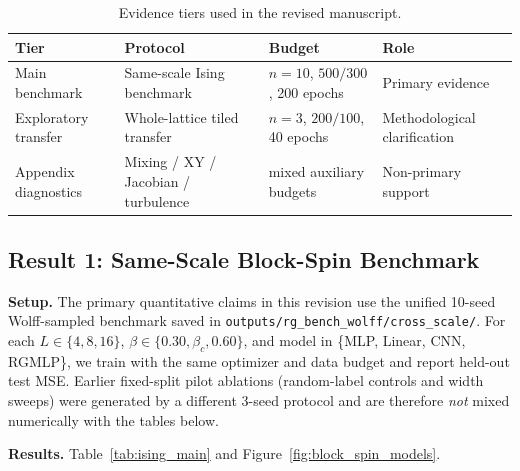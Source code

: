 \documentclass[12pt,a4paper]{memoir}
\begin{document}
\begin{table}[ht]
    \centering
    \caption{Evidence tiers used in the revised manuscript.}
    \small
    \begin{tabular}{@{}p{} p{} p{} p{}@{}}
        \toprule
        \textbf{Tier} & \textbf{Protocol} & \textbf{Budget} & \textbf{Role} \\
        \midrule
        Main benchmark & Same-scale Ising benchmark & $n=10$, $500/300$, 200 epochs & Primary evidence \\
        Exploratory transfer & Whole-lattice tiled transfer & $n=3$, $200/100$, 40 epochs & Methodological clarification \\
        Appendix diagnostics & Mixing / XY / Jacobian / turbulence & mixed auxiliary budgets & Non-primary support \\
        \bottomrule
    \end{tabular}
    \label{tab:evidence_tiers}
\end{table}

\subsection{Result 1: Same-Scale Block-Spin Benchmark}
\label{sec:block_spin_learning}

\textbf{Setup.}  The primary quantitative claims in this revision use the
unified 10-seed Wolff-sampled benchmark saved in
\texttt{outputs/rg\_bench\_wolff/cross\_scale/}.  For each
$L \in \{4,8,16\}$, $\beta \in \{0.30,\beta_c,0.60\}$, and model in
\{MLP, Linear, CNN, RGMLP\}, we train with the same optimizer and data
budget and report held-out test MSE.  Earlier fixed-split pilot ablations
(random-label controls and width sweeps) were generated by a different
3-seed protocol and are therefore \emph{not} mixed numerically with the
tables below.

\textbf{Results.}  Table~\ref{tab:ising_main} and Figure~\ref{fig:block_spin_models}.
\end{document}

